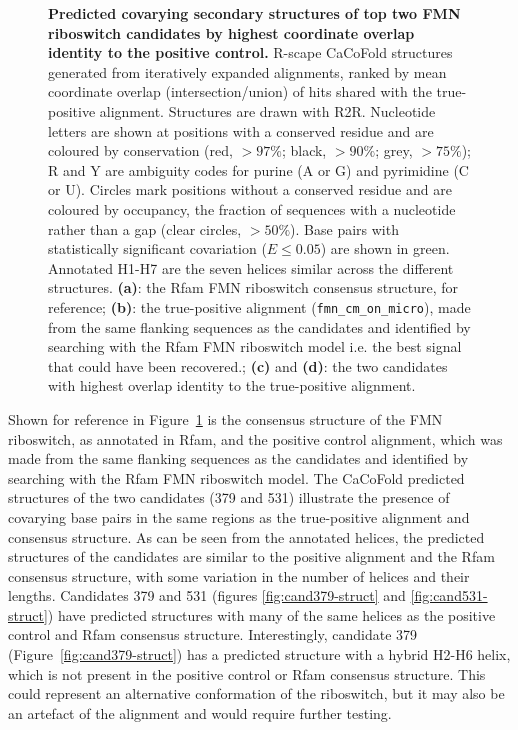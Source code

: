 \begin{figure}[htbp]
    \caption[Predicted covarying secondary structures of positive control candidates]{\textbf{Predicted covarying secondary structures of top two FMN riboswitch candidates by highest coordinate overlap identity to the positive control.}
    R-scape CaCoFold structures generated from iteratively expanded alignments, ranked by mean coordinate overlap (intersection/union) of hits shared with the true-positive alignment.
    Structures are drawn with R2R. Nucleotide letters are shown at positions with a conserved residue and are coloured by conservation (red, $>97\%$; black, $>90\%$; grey, $>75\%$); R and Y are ambiguity codes for purine (A or G) and pyrimidine (C or U). 
    Circles mark positions without a conserved residue and are coloured by occupancy, the fraction of sequences with a nucleotide rather than a gap (clear circles, $>50\%$). 
    Base pairs with statistically significant covariation ($E \le 0.05$) are shown in green.
    Annotated H1-H7 are the seven helices similar across the different structures.
    \textbf{(a)}: the Rfam \ac{FMN} riboswitch consensus structure, for reference;
    \textbf{(b)}: the true-positive alignment (\texttt{fmn\_cm\_on\_micro}), made from the same flanking sequences as the candidates and identified by searching with the Rfam \ac{FMN} riboswitch model i.e. the best signal that could have been recovered.;
    \textbf{(c)} and \textbf{(d)}: the two candidates with highest overlap identity to the true-positive alignment.}
    \label{fig:drh-top-structures}
\end{figure}

Shown for reference in Figure~\ref{fig:drh-top-structures} is the consensus structure of the \ac{FMN} riboswitch, as annotated in Rfam, and the positive control alignment, which was made from the same flanking sequences as the candidates and identified by searching with the Rfam \ac{FMN} riboswitch model.
The CaCoFold predicted structures of the two candidates (379 and 531) illustrate the presence of covarying base pairs in the same regions as the true-positive alignment and consensus structure.
As can be seen from the annotated helices, the predicted structures of the candidates are similar to the positive alignment and the Rfam consensus structure, with some variation in the number of helices and their lengths.
Candidates 379 and 531 (figures \ref{fig:cand379-struct} and \ref{fig:cand531-struct}) have predicted structures with many of the same helices as the positive control and Rfam consensus structure.
Interestingly, candidate 379 (Figure~\ref{fig:cand379-struct}) has a predicted structure with a hybrid H2-H6 helix, which is not present in the positive control or Rfam consensus structure.
This could represent an alternative conformation of the riboswitch, but it may also be an artefact of the alignment and would require further testing.

